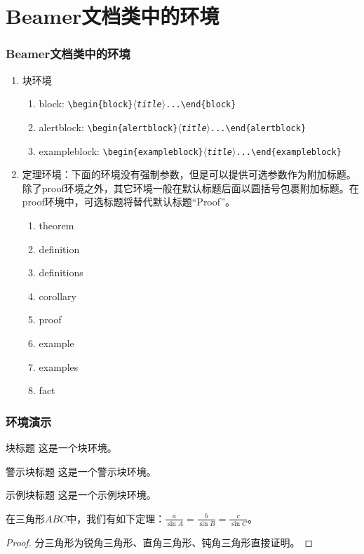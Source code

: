 \documentclass{beamer}
\newcommand\m[1]{\mbox{$\langle${\rmfamily\textit{#1}\/}$\rangle$}}
\newcommand{\marg}[1]{{\tt\string{}\m{#1}{\tt\string}}}
\begin{document}
\section{Beamer文档类中的环境}
\begin{frame}
\frametitle{Beamer文档类中的环境}
\begin{enumerate}[I]
\item 块环境
\begin{enumerate}
\item block: \verb|\begin{block}|\marg{title}\verb|...\end{block}|
\item alertblock: \verb|\begin{alertblock}|\marg{title}\verb|...\end{alertblock}|
\item exampleblock: \verb|\begin{exampleblock}|\marg{title}\verb|...\end{exampleblock}|
\end{enumerate}
\item 定理环境：下面的环境没有强制参数，但是可以提供可选参数作为附加标题。除了proof环境之外，其它环境一般在默认标题后面以圆括号包裹附加标题。在proof环境中，可选标题将替代默认标题“Proof”。
\begin{enumerate}
\item theorem
\item definition
\item definitions
\item corollary
\item proof
\item example
\item examples
\item fact
\end{enumerate}
\end{enumerate}
\end{frame}

\begin{frame}
\frametitle{环境演示}
\begin{block}{块标题}
这是一个块环境。
\end{block}
\begin{alertblock}{警示块标题} 
这是一个警示块环境。
\end{alertblock}
\begin{exampleblock}{示例块标题}
这是一个示例块环境。
\end{exampleblock}
\begin{theorem}[正弦定理]
在三角形$ABC$中，我们有如下定理：$\frac{a}{\sin A}=\frac{b}{\sin B}=\frac{c}{\sin C}$。
\end{theorem}
\begin{proof}
分三角形为锐角三角形、直角三角形、钝角三角形直接证明。
\end{proof}
\end{frame}
\end{document}
